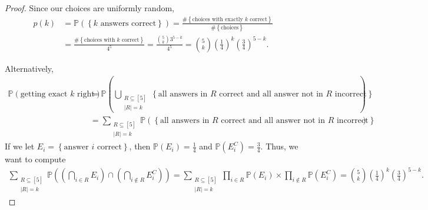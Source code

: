 \begin{proof}
    Since our choices are uniformly random, 
    \begin{align*}
        p(k) &= \mathbb{P} (\left\{ k \text{ answers correct}  \right\}) = \frac{\# \left\{ \text{choices with exactly } k \text{ correct}   \right\} }{\# \left\{ \text{choices}  \right\} } \\
        &= \frac{\# \left\{ \text{choices with } k \text{ correct}   \right\} }{4^5} = \frac{\binom{5}{k} 3^{5 - k}}{4^5} = \binom{5}{k} \left( \frac{1}{4} \right)^k \left( \frac{3}{4} \right)^{5-k}.  
    \end{align*}

    Alternatively, 
    \begin{align*}
        \mathbb{P} (\text{getting exact } k \text{ right}) &= \mathbb{P} ( \bigcup_{\substack{R \subseteq [5] \\ \vert R \vert = k }} \left\{ \text{all answers in } R \text{ correct and all answer not in } R \text{ incorrect}    \right\}   ) \\
        &= \sum_{\substack{R \subseteq [5] \\ \vert R \vert = k}} \mathbb{P} \left( \left\{ \text{all answers in } R \text{ correct and all answer not in } R \text{ incorrect}    \right\}   \right)   
    \end{align*}
    If we let \(E_i = \left\{ \text{answer } i \text{ correct}   \right\} \), then \(\mathbb{P} (E_i) = \frac{1}{4}\) and \(\mathbb{P} (E_i^C) = \frac{3}{4}\). 
    Thus, we want to compute
    \begin{align*}
        \sum_{\substack{R \subseteq [5] \\ \vert R \vert = k}} \mathbb{P} \left( \left( \bigcap_{i \in R} E_i  \right) \cap \left( \bigcap_{i \notin R} E_i^C  \right)   \right) = \sum_{\substack{R \subseteq [5] \\ \vert R \vert = k }} \prod _{i \in R} \mathbb{P} (E_i) \times \prod _{i \notin R} \mathbb{P} (E_i^C) = \binom{5}{k} \left( \frac{1}{4} \right)^k \left( \frac{3}{4} \right)^{5-k}.     
    \end{align*}   
\end{proof}